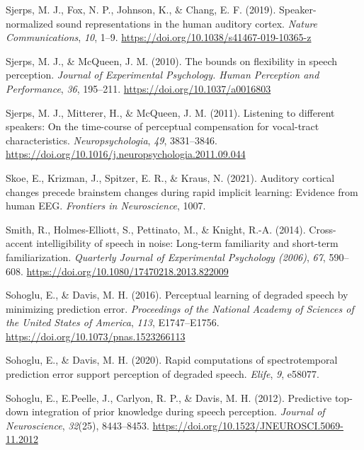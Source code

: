 \documentclass[
  11pt,
  english,
  man,floatsintext]{apa6}
\newlength{\cslhangindent}
\newlength{\cslentryspacingunit} %
\newenvironment{CSLReferences}[2] %
 {%
  \setlength{\parindent}{0pt}
  \ifodd #1
  \let\oldpar\par
  \def\par{\hangindent=\cslhangindent\oldpar}
  \fi
  \setlength{\parskip}{#2\cslentryspacingunit}
 }%
 {}
\begin{document}
\begin{CSLReferences}{1}{0}
\leavevmode{}%
Sjerps, M. J., Fox, N. P., Johnson, K., \& Chang, E. F. (2019). Speaker-normalized sound representations in the human auditory cortex. \emph{Nature Communications}, \emph{10}, 1--9. \url{https://doi.org/10.1038/s41467-019-10365-z}

\leavevmode{}%
Sjerps, M. J., \& McQueen, J. M. (2010). The bounds on flexibility in speech perception. \emph{Journal of Experimental Psychology. Human Perception and Performance}, \emph{36}, 195--211. \url{https://doi.org/10.1037/a0016803}

\leavevmode{}%
Sjerps, M. J., Mitterer, H., \& McQueen, J. M. (2011). Listening to different speakers: On the time-course of perceptual compensation for vocal-tract characteristics. \emph{Neuropsychologia}, \emph{49}, 3831--3846. \url{https://doi.org/10.1016/j.neuropsychologia.2011.09.044}

\leavevmode{}%
Skoe, E., Krizman, J., Spitzer, E. R., \& Kraus, N. (2021). Auditory cortical changes precede brainstem changes during rapid implicit learning: Evidence from human EEG. \emph{Frontiers in Neuroscience}, 1007.

\leavevmode{}%
Smith, R., Holmes-Elliott, S., Pettinato, M., \& Knight, R.-A. (2014). Cross-accent intelligibility of speech in noise: Long-term familiarity and short-term familiarization. \emph{Quarterly Journal of Experimental Psychology (2006)}, \emph{67}, 590--608. \url{https://doi.org/10.1080/17470218.2013.822009}

\leavevmode{}%
Sohoglu, E., \& Davis, M. H. (2016). Perceptual learning of degraded speech by minimizing prediction error. \emph{Proceedings of the National Academy of Sciences of the United States of America}, \emph{113}, E1747--E1756. \url{https://doi.org/10.1073/pnas.1523266113}

\leavevmode{}%
Sohoglu, E., \& Davis, M. H. (2020). Rapid computations of spectrotemporal prediction error support perception of degraded speech. \emph{Elife}, \emph{9}, e58077.

\leavevmode{}%
Sohoglu, E., E.Peelle, J., Carlyon, R. P., \& Davis, M. H. (2012). Predictive top-down integration of prior knowledge during speech perception. \emph{Journal of Neuroscience}, \emph{32}(25), 8443--8453. \url{https://doi.org/10.1523/JNEUROSCI.5069-11.2012}


\end{CSLReferences}
\end{document}
